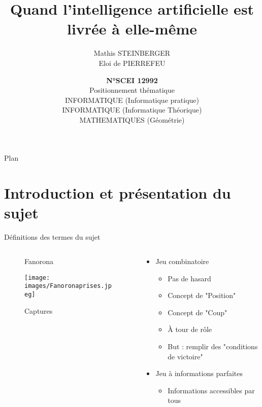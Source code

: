\documentclass{beamer}
\title[Le jeu Fanorona]{\LARGE Quand l'intelligence artificielle est livrée à elle-même}
\author[Mathis STEINBERGER]{Mathis STEINBERGER\texorpdfstring{\\Eloi de PIERREFEU}{}}
\date[2023-2024]{\scriptsize
\textbf{N°SCEI 12992}
\texorpdfstring{\\Positionnement thématique\\INFORMATIQUE (Informatique pratique)\\INFORMATIQUE (Informatique Théorique)\\MATHEMATIQUES (Géométrie)}{}
}
\begin{document}

\frame{\titlepage}

\begin{frame}{Plan}
    \tableofcontents
\end{frame}

\section{Introduction et présentation du sujet}

\begin{frame}{Définitions des termes du sujet}
    \begin{columns}
        \begin{column}{0.43\textwidth}
        \centering
        \begin{figure}[h]
            \begin{minipage}[b]{\linewidth}
            \centering
                
                \caption{Fanorona}
                \label{Fig1}
            \end{minipage}
            \vfill
            \begin{minipage}[b]{\linewidth}
            \centering
                \texttt{[image: images/Fanoronaprises.jpeg]}
                \caption{Captures}
                \label{Fig2}
            \end{minipage}
        \end{figure}
    \end{column}
    \begin{column}{0.57\textwidth}
        \begin{itemize}
            \item Jeu combinatoire
            \begin{itemize}
                \item Pas de hasard
                \item Concept de "Position"
                \item Concept de "Coup"
                \item À tour de rôle
                \item But : remplir des "conditions de victoire"
            \end{itemize}
            \item Jeu à informations parfaites
            \begin{itemize}
                \item Informations accessibles par tous
            \end{itemize}
        \end{itemize}
    \end{column}
    \end{columns}
\end{frame}
\end{document}
